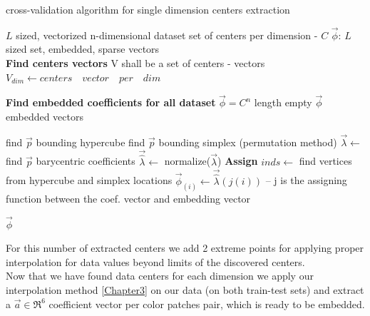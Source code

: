 \begin{algorithm}
	\caption{cross-validation algorithm for single dimension centers extraction}
	\begin{algorithmic}		
		
		\REQUIRE $L$ sized, vectorized n-dimensional dataset
		\REQUIRE set of centers per dimension - $C$
		\ENSURE $\overrightarrow{\phi}$: $L$ sized set, embedded, sparse vectors\\
		
		\STATE \textbf{Find centers vectors}
		\STATE V shall be a set of centers - vectors
		\STATE $V_{dim} \leftarrow centers \quad vector \quad per \quad dim$
		\ENDFOR
		
		\STATE \textbf{Find embedded coefficients for all dataset}
		\STATE $\overrightarrow{\phi} = C^{n}$ length empty $\overrightarrow{\phi}$ embedded vectors
		
		\STATE find $\overrightarrow{p}$ bounding hypercube 
		\STATE find $\overrightarrow{p}$ bounding simplex (permutation method)
		\STATE $\overrightarrow{\lambda} \leftarrow$ find $\overrightarrow{p}$ barycentric coefficients 
		\STATE $\overrightarrow{\hat{\lambda}} \leftarrow$ normalize($\overrightarrow{\lambda}$)
		\ENDFOR
		\STATE \textbf{Assign}
		\STATE $inds \leftarrow$ find vertices from hypercube and simplex locations
		\STATE $\overrightarrow{\phi}_{(i)} \leftarrow \overrightarrow{\hat{\lambda}}(j(i))$ -- j is the assigning function between the coef. vector and embedding vector
		\ENDFOR
		\ENDFOR
		
		\RETURN $\overrightarrow{\phi}$
		
		
	\end{algorithmic}
\end{algorithm}	


For this number of extracted centers we add 2 extreme points for applying proper interpolation for data values beyond limits of the discovered centers.
\\
Now that we have found data centers for each dimension we apply our interpolation method \ref{Chapter3} on our data (on both train-test sets) and extract a $\overrightarrow{a} \in \Re^6$ coefficient vector per color patches pair, which is ready to be embedded.


